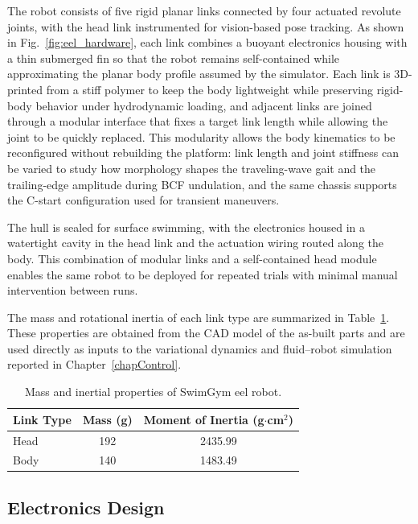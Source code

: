 The robot consists of five rigid planar links connected by four actuated revolute joints, with the head link instrumented for vision-based pose tracking. As shown in Fig.~\ref{fig:eel_hardware}, each link combines a buoyant electronics housing with a thin submerged fin so that the robot remains self-contained while approximating the planar body profile assumed by the simulator. Each link is 3D-printed from a stiff polymer to keep the body lightweight while preserving rigid-body behavior under hydrodynamic loading, and adjacent links are joined through a modular interface that fixes a target link length while allowing the joint to be quickly replaced. This modularity allows the body kinematics to be reconfigured without rebuilding the platform: link length and joint stiffness can be varied to study how morphology shapes the traveling-wave gait and the trailing-edge amplitude during BCF undulation, and the same chassis supports the C-start configuration used for transient maneuvers.

The hull is sealed for surface swimming, with the electronics housed in a watertight cavity in the head link and the actuation wiring routed along the body. This combination of modular links and a self-contained head module enables the same robot to be deployed for repeated trials with minimal manual intervention between runs.

The mass and rotational inertia of each link type are summarized in Table~\ref{tab:eel_inertia}. These properties are obtained from the CAD model of the as-built parts and are used directly as inputs to the variational dynamics and fluid--robot simulation reported in Chapter~\ref{chapControl}.

\begin{table}[t]
\centering
\caption{Mass and inertial properties of SwimGym eel robot.}
\label{tab:eel_inertia}
\renewcommand{\arraystretch}{1.2}
\begin{tabular}{lcc}
\hline
\textbf{Link Type} & \textbf{Mass (g)} & \textbf{Moment of Inertia (g$\cdot$cm$^2$)} \\
\hline
Head & 192 & 2435.99 \\
Body & 140 & 1483.49 \\
\hline
\end{tabular}
\end{table}

\subsection{Electronics Design}


